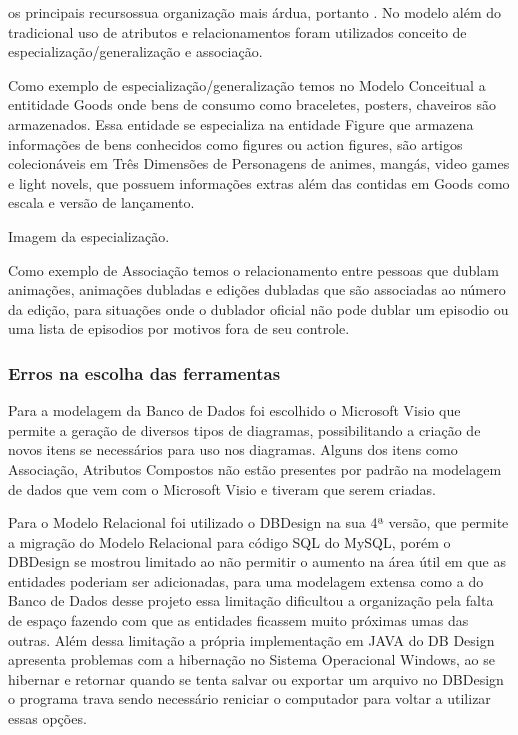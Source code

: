 \documentclass[12pt]{article}
\begin{document}
os principais recursossua organização mais árdua, portanto . No modelo além do tradicional uso de atributos e relacionamentos foram utilizados conceito de especialização/generalização e associação.

Como exemplo de especialização/generalização temos no Modelo Conceitual a entitidade Goods onde bens de consumo como braceletes, posters, chaveiros são armazenados. Essa entidade se especializa na entidade Figure que armazena informações de bens conhecidos como figures ou action figures, são artigos colecionáveis em Três Dimensões de Personagens de animes, mangás, video games e light novels,
 que possuem informações extras além das contidas em Goods como escala e versão de lançamento.

Imagem da especialização.

Como exemplo de Associação temos o relacionamento entre pessoas que dublam animações, animações dubladas e edições dubladas que são associadas ao número da edição, para situações onde o dublador oficial não pode dublar um episodio ou uma lista de episodios por motivos fora de seu controle. 



\subsubsection{Erros na escolha das ferramentas}

Para a modelagem da Banco de Dados foi escolhido o Microsoft Visio que permite a geração de diversos tipos de diagramas, possibilitando a criação de novos itens se necessários para uso nos diagramas. Alguns dos itens como Associação, Atributos Compostos não estão presentes por padrão na modelagem de dados que vem com o Microsoft Visio e tiveram que serem criadas.

Para o Modelo Relacional foi utilizado o DBDesign na sua 4ª versão, que permite a migração do Modelo Relacional para código SQL do MySQL, porém o DBDesign se mostrou limitado ao não permitir o aumento na área útil em que as entidades poderiam ser adicionadas, para uma modelagem extensa como a do Banco de Dados desse projeto essa limitação dificultou a organização pela falta de espaço fazendo com que as entidades ficassem muito próximas umas das outras. 
Além dessa limitação a própria implementação em JAVA do DB Design apresenta problemas com a hibernação no Sistema Operacional Windows, ao se hibernar e retornar quando se tenta salvar ou exportar um arquivo no DBDesign o programa trava sendo necessário reniciar o computador para voltar a utilizar essas opções.
\end{document}
